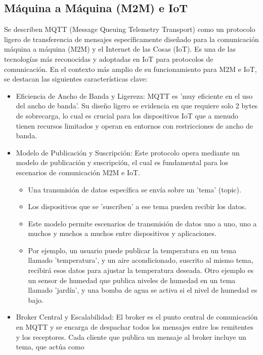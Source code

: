 \documentclass{report}
\begin{document}
\subsection{Máquina a Máquina (M2M) e IoT}
Se describen MQTT (Message Queuing Telemetry Transport) como un protocolo ligero de transferencia de mensajes específicamente 
diseñado para la comunicación máquina a máquina (M2M) y el Internet de las Cosas (IoT). Es una de las tecnologías más reconocidas y 
adoptadas en IoT para protocolos de comunicación.
En el contexto más amplio de su funcionamiento para M2M e IoT, se  destacan las siguientes características clave:
\begin{itemize}
    \item Eficiencia de Ancho de Banda y Ligereza: MQTT es 'muy eficiente en el uso del ancho de banda'. Su diseño ligero se evidencia en que 
    requiere solo 2 bytes de sobrecarga, lo cual es crucial para los dispositivos IoT que a menudo tienen recursos limitados y operan en entornos 
    con restricciones de ancho de banda.
    \item Modelo de Publicación y Suscripción: Este protocolo opera mediante un modelo de publicación y suscripción, el cual es fundamental 
    para los escenarios de comunicación M2M e IoT.
        \begin{itemize}
            \item Una transmisión de datos específica se envía sobre un 'tema' (topic).
            \item Los dispositivos que se 'suscriben' a ese tema pueden recibir los datos.
            \item Este modelo permite escenarios de transmisión de datos uno a uno, uno a muchos y muchos a muchos entre dispositivos y aplicaciones.
            \item Por ejemplo, un usuario puede publicar la temperatura en un tema llamado 'temperatura', y un aire acondicionado, 
            suscrito al mismo tema, recibirá esos datos para ajustar la temperatura deseada. Otro ejemplo es un sensor de humedad que publica 
            niveles de humedad en un tema llamado 'jardín', y una bomba de agua se activa si el nivel de humedad es bajo.
        \end{itemize}
    \item Broker Central y Escalabilidad: El broker es el punto central de comunicación en MQTT y se encarga de despachar todos los 
    mensajes entre los remitentes y los receptores. Cada cliente que publica un mensaje al broker incluye un tema, que actúa como 

\end{itemize}
\end{document}
